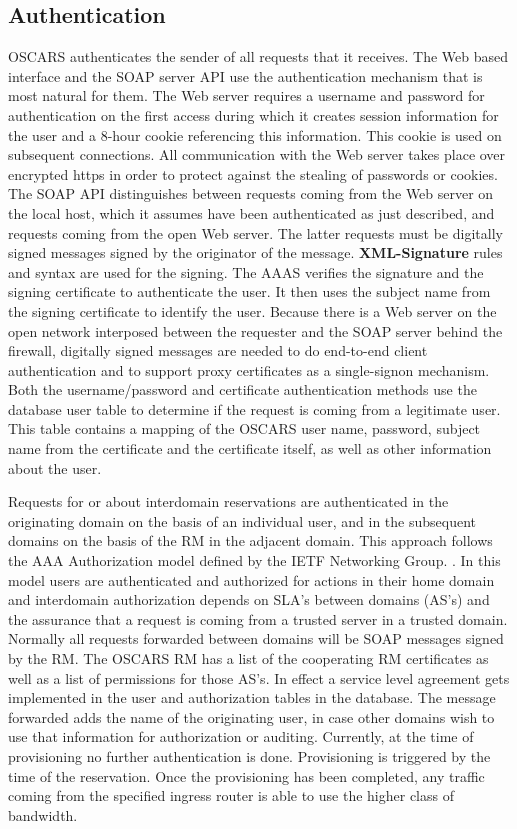 \documentclass[conference]{IEEEtran}
\begin{document}
\subsection{Authentication}
OSCARS authenticates the sender of all requests that it receives.
The Web based interface and the SOAP server API use the
authentication mechanism that is most natural for them. The Web server
requires a username and password for authentication on the first
access during which it creates session information for the user and a
8-hour cookie referencing this information. This cookie is used on subsequent
connections. All communication with the Web server takes place over
encrypted https in order to protect against the stealing of passwords
or cookies. The SOAP API distinguishes between requests coming from
the Web server on the local host, which it assumes have been authenticated
as just described, and requests coming from the open Web server. The 
latter requests must be digitally signed messages signed by the
originator of the message.  \textbf{XML-Signature} rules and syntax are used 
for the signing.
The AAAS verifies the signature and the signing certificate to authenticate
the user. It then uses the subject name from the signing certificate
to identify the user. Because there is a Web server on the open network 
interposed between the
requester and the SOAP server behind the firewall, digitally signed messages 
are 
needed to do end-to-end client authentication and to support proxy certificates
as a single-signon mechanism. Both the username/password and certificate 
authentication methods use the database user table to
determine if the request is coming from a legitimate user. This table
contains a mapping of the OSCARS user name, password, subject name
from the certificate and the certificate itself, as well as other
information about the user.

Requests for or about interdomain
reservations are authenticated in the originating domain on the basis
of an individual user, and in the subsequent domains on the basis of
the RM in the adjacent domain.  This approach follows the AAA  Authorization
model defined by the IETF Networking Group. \cite{AAA}. In this model
users are authenticated and authorized for actions in their home domain and 
interdomain authorization depends on SLA's between domains (AS's) and the
assurance that  a request is coming from a trusted server in a trusted 
domain. Normally all requests forwarded between domains will be SOAP messages
signed by the RM. The OSCARS RM has a list of the
cooperating RM certificates as well as a list of
permissions for those AS's. In effect a service level agreement gets
implemented in the user and authorization tables in the database. The message
forwarded adds the name of the originating user, in case other
domains wish to use that information for authorization or auditing.
Currently, at the time of provisioning no further authentication is
done. Provisioning is triggered by the time of the reservation. Once
the provisioning has been completed, any traffic coming from the
specified ingress router is able to use the higher class of bandwidth.
\end{document}
